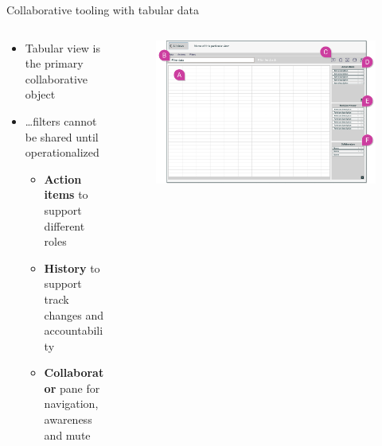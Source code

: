 \documentclass[aspectratio=169]{beamer}
\begin{document}
\begin{frame}{Collaborative tooling with tabular data}
    \begin{columns}
        \begin{column}{0.4\textwidth}
            \begin{itemize}
                \small
                \item Tabular view is the primary collaborative object
                \item \dots filters cannot be shared until operationalized
                \begin{itemize}
                    \scriptsize
                    \vspace{0.4em}
                    \item \textbf{Action items} to support different roles
                    \vspace{0.2em}
                    \item \textbf{History} to support track changes and accountability
                    \vspace{0.2em}
                    \item \textbf{Collaborator} pane for navigation, awareness and mute
                \end{itemize}
            \end{itemize}
        \end{column}
        \begin{column}{0.6\textwidth}
            \begin{figure}[h]
                \centering
                \includegraphics[width=1\textwidth]{images/filter-view-with-marks.png}
            \end{figure}
        \end{column}
    \end{columns}
\end{frame}
\end{document}
